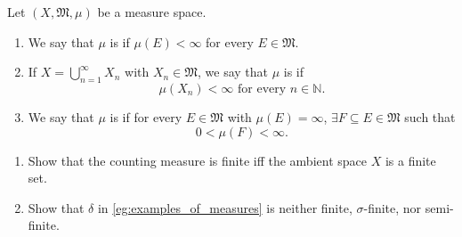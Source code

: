 \documentclass[notoc,notitlepage]{tufte-book}
\begin{document}
\begin{defn}\label{defn:finitivity_sigma_finitivity_and_semi_finitivity_of_a_measure}
  Let $(X, \mathfrak{M}, \mu)$ be a measure space.
  \begin{enumerate}
    \item We say that $\mu$ is  if $\mu(E) < \infty$
      for every $E \in \mathfrak{M}$.
    \item If $X = \bigcup_{n=1}^{\infty} X_n$ with $X_n \in \mathfrak{M}$,
      we say that $\mu$ is  if
      \begin{equation*}
        \mu(X_n) < \infty \text{ for every } n \in \mathbb{N}.
      \end{equation*}
    \item We say that $\mu$ is  if for every
      $E \in \mathfrak{M}$ with $\mu(E) = \infty$,
      $\exists F \subseteq E \in \mathfrak{M}$ such that
      \begin{equation*}
        0 < \mu(F) < \infty.
      \end{equation*}
  \end{enumerate}
\end{defn}

\begin{ex}
  \begin{enumerate}
    \item Show that the counting measure is finite iff
      the ambient space $X$ is a finite set.
    \item Show that $\delta$ in \cref{eg:examples_of_measures}
      is neither finite, $\sigma$-finite, nor semi-finite.
  \end{enumerate}
\end{ex}
\end{document}

